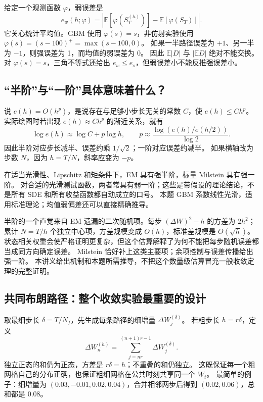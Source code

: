 \documentclass[11pt,a4paper,fontset=none]{ctexart}
\numberwithin{equation}{section}
\newcommand{\E}{\mathbb E}
\begin{document}
给定一个观测函数 $\varphi$，弱误差是
\begin{equation}\label{eq:errors-weak}
 e_w(h;\varphi)=\left|\E[\varphi(S_T^{(h)})]-\E[\varphi(S_T)]\right|.
\end{equation}
它关心统计平均值。GBM 使用 $\varphi(s)=s$，非仿射实验使用 $\varphi(s)=(s-100)^+=\max(s-100,0)$。
如果一半路径误差为 $+1$、另一半为 $-1$，则强误差为 1，而均值的弱误差为 0。
因此 $\E|D|$ 与 $|\E D|$ 绝对不能交换。
对 $\varphi(s)=s$，三角不等式还给出 $e_w\le e_s$，但弱误差小不能反推强误差小。

\subsection{“半阶”与“一阶”具体意味着什么？}
说 $e(h)=O(h^p)$，是说存在与足够小步长无关的常数 $C$，使 $e(h)\le Ch^p$。
实际绘图时若出现 $e(h)\approx Ch^p$ 的渐近关系，就有
\begin{equation}\label{eq:errors-order}
 \log e(h)\approx\log C+p\log h,\qquad
 p\approx\frac{\log(e(h)/e(h/2))}{\log2}.
\end{equation}
因此半阶对应步长减半、误差约乘 $1/\sqrt2$；一阶对应误差约减半。
如果横轴改为步数 $N$，因为 $h=T/N$，斜率应变为 $-p$。

在适当光滑性、Lipschitz 和矩条件下，EM 具有强半阶，标量 Milstein 具有强一阶。
对合适的光滑测试函数，两者常具有弱一阶；这些是带假设的理论结论，不是所有 SDE 和所有收益函数都自动成立的口号。
本题 GBM 系数线性光滑，适用标准理论；均值弱偏差还可以直接精确推导。

半阶的一个直觉来自 EM 遗漏的二次随机项。每步 $(\Delta W)^2-h$ 的方差为 $2h^2$；
累计 $N=T/h$ 个独立中心项，方差规模变成 $O(h)$，标准差规模是 $O(\sqrt h)$。
状态相关权重会使严格证明更复杂，但这个估算解释了为何不能把每步随机误差都当成同方向确定误差。
Milstein 恰好补上这类主要项；余项控制与误差传播给出强一阶。
本讲义给出机制和本题所需推导，不把这个数量级估算冒充一般收敛定理的完整证明。

\subsection{共同布朗路径：整个收敛实验最重要的设计}
取最细步长 $\delta=T/N_f$，先生成每条路径的细增量 $\Delta W_j^{(\delta)}$。
若粗步长 $h=r\delta$，定义
\begin{equation}\label{eq:errors-coupling}
 \Delta W_n^{(h)}=\sum_{j=nr}^{(n+1)r-1}\Delta W_j^{(\delta)}.
\end{equation}
独立正态的和仍为正态，方差是 $r\delta=h$；不重叠的和仍独立。
这既保证每一个粗网格自己的分布正确，也保证粗细网格在公共时刻共享同一个 $W_t$。
最简单的例子：细增量为 $(0.03,-0.01,0.02,0.04)$，合并相邻两步后得到 $(0.02,0.06)$，总和都是 $0.08$。
\end{document}
